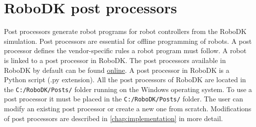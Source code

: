 \section{RoboDK post processors}

Post processors generate robot programs for robot controllers from the RoboDK simulation. Post processors are essential for offline programming of robots. A post processor defines the vendor-specific rules a robot program must follow. A robot is linked to a post processor in RoboDK. The post processors available in RoboDK by default can be found \href{https://robodk.com/doc/en/Post-Processors.html#AvailablePosts}{online}.  
A post processor in RoboDK is a Python script (.py extension). All the post processors of RoboDK are located in the
\texttt{C:/RoboDK/Posts/} folder running on the Windows operating system.  To use a post processor it must be placed in the \texttt{C:/RoboDK/Posts/} folder. The user can modify an existing post processor or create a new one from scratch. Modifications of post processors are described in \autoref{chap:implementation} in more detail. 